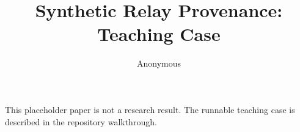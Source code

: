 \documentclass{article}
\begin{document}
\title{Synthetic Relay Provenance: Teaching Case}
\author{Anonymous}
\maketitle
This placeholder paper is not a research result. The runnable teaching case is described in the repository walkthrough.
\end{document}
